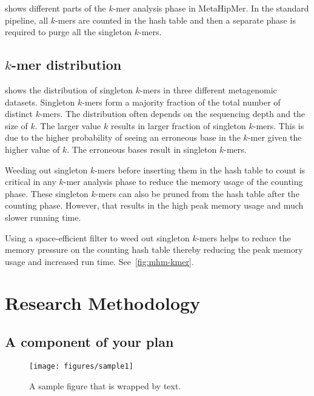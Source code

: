  shows different parts of the $k$-mer analysis phase in MetaHipMer. In the standard pipeline, all $k$-mers are counted in the hash table and then a separate phase is required to purge all the singleton $k$-mers. 

\subsection{$k$-mer distribution}

 shows the distribution of singleton $k$-mers in three different metagenomic datasets. Singleton $k$-mers form a majority fraction of the total number of distinct $k$-mers. The distribution often depends on the sequencing depth and the size of $k$. The larger value $k$ results in larger fraction of singleton $k$-mers. This is due to the higher probability of seeing an erroneous base in the $k$-mer given the higher value of $k$. The erroneous bases result in singleton $k$-mers. 

Weeding out singleton $k$-mers before inserting them in the hash table to count is critical in any $k$-mer analysis phase to reduce the memory usage of the counting phase. These singleton $k$-mers can also be pruned from the hash table after the counting phase. However, that results in the high peak memory usage and much slower running time.

Using a space-efficient filter to weed out singleton $k$-mers helps to reduce the memory pressure on the counting hash table thereby reducing the peak memory usage and increased run time. See~\cref{fig:mhm-kmer}.


\section{Research Methodology}


\subsection{A component of your plan}

\setlength\intextsep{0pt}
\begin{wrapfigure}[20]{R}{2.4in}
\vspace{-5pt}
\centering
\texttt{[image: figures/sample1]}
\caption{A sample figure that is wrapped by text.}
\label{fig1}
\end{wrapfigure}

